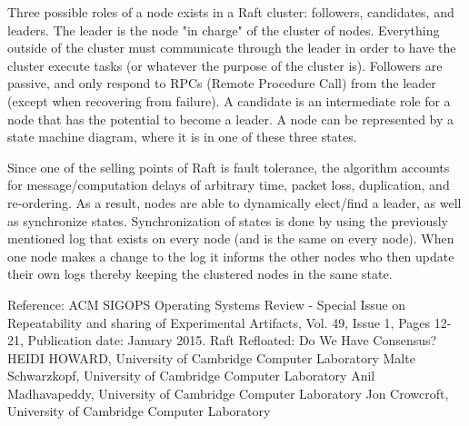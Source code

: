 \documentclass[11pt]{article}
\begin{document}
Three possible roles of a node exists in a Raft cluster: followers, candidates, and leaders. The leader is the node "in charge" of the cluster of nodes. Everything outside of the cluster must communicate through the leader in order to have the cluster execute tasks (or whatever the purpose of the cluster is). Followers are passive, and only respond to RPCs (Remote Procedure Call) from the leader (except when recovering from failure). A candidate is an intermediate role for a node that has the potential to become a leader. A node can be represented by a state machine diagram, where it is in one of these three states.

Since one of the selling points of Raft is fault tolerance, the algorithm accounts for message/computation delays of arbitrary time, packet loss, duplication, and re-ordering. As a result, nodes are able to dynamically elect/find a leader, as well as synchronize states. Synchronization of states is done by using the previously mentioned log that exists on every node (and is the same on every node). When one node makes a change to the log it informs the other nodes who then update their own logs thereby keeping the clustered nodes in the same state.

Reference: ACM SIGOPS Operating Systems Review - Special Issue on Repeatability and sharing of Experimental Artifacts, Vol. 49, Issue 1, Pages 12-21, Publication date: January 2015.
Raft Refloated: Do We Have Consensus?
HEIDI HOWARD, University of Cambridge Computer Laboratory
Malte Schwarzkopf, University of Cambridge Computer Laboratory
Anil Madhavapeddy, University of Cambridge Computer Laboratory
Jon Crowcroft, University of Cambridge Computer Laboratory
\end{document}
